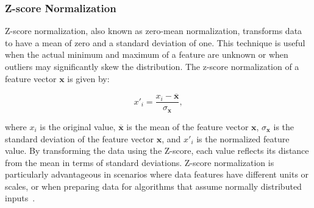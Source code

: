 \subsubsection{Z-score Normalization}
Z-score normalization, also known as zero-mean normalization, transforms data to have a mean of zero and a standard deviation of one.
This technique is useful when the actual minimum and maximum of a feature are unknown or when outliers may significantly skew the distribution.
The z-score normalization of a feature vector \(\mathbf{x}\) is given by:

$$
x'_i = \frac{x_i - \overline{\mathbf{x}}}{\sigma_\mathbf{x}},
$$

where \(x_i\) is the original value, \(\overline{\mathbf{x}}\) is the mean of the feature vector \(\mathbf{x}\), \(\sigma_\mathbf{x}\) is the standard deviation of the feature vector \(\mathbf{x}\), and \(x'_i\) is the normalized feature value.
By transforming the data using the Z-score, each value reflects its distance from the mean in terms of standard deviations.
Z-score normalization is particularly advantageous in scenarios where data features have different units or scales, or when preparing data for algorithms that assume normally distributed inputs~\cite{dataminingConcepts}.
